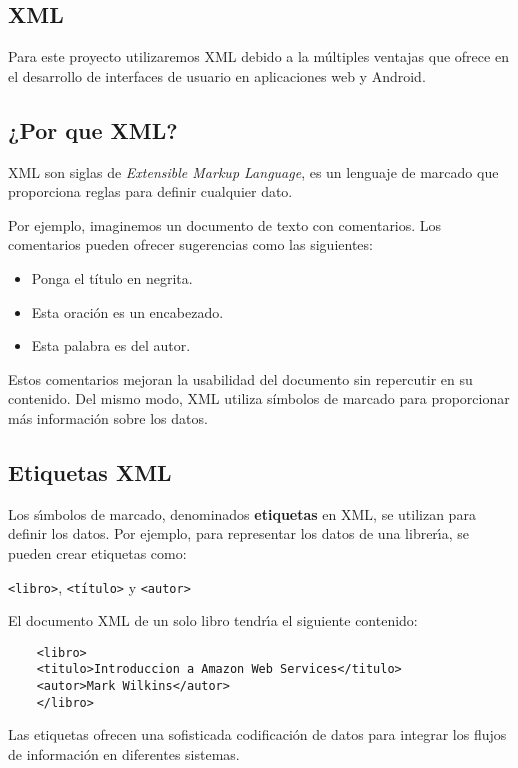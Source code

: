 

\subsection{XML}
Para este proyecto utilizaremos XML debido a la múltiples ventajas que ofrece en el desarrollo de interfaces de usuario en aplicaciones web y Android.  

\subsection*{¿Por que XML?}

XML son siglas de \textit{Extensible Markup Language}, es un lenguaje de marcado que proporciona reglas para definir cualquier dato.

Por ejemplo, imaginemos un documento de texto con comentarios. Los comentarios pueden ofrecer sugerencias como las siguientes:
\begin{itemize}
	\item Ponga el título en negrita.
	\item Esta oración es un encabezado.
	\item Esta palabra es del autor.
\end{itemize}

Estos comentarios mejoran la usabilidad del documento sin repercutir en su contenido. Del mismo modo, XML utiliza símbolos de marcado para proporcionar más información sobre los datos.

\subsection*{Etiquetas XML}

Los s\'{\i}mbolos de marcado, denominados \textbf{etiquetas} en XML, se utilizan para definir los datos. Por ejemplo, para representar los datos de una librer\'{\i}a, se pueden crear etiquetas como:

\texttt{\textless libro\textgreater}, \texttt{\textless t\'{\i}tulo\textgreater} y \texttt{\textless autor\textgreater}

El documento XML de un solo libro tendr\'{\i}a el siguiente contenido:

\begin{lstlisting}
	<libro>
	<titulo>Introduccion a Amazon Web Services</titulo>
	<autor>Mark Wilkins</autor>
	</libro>
\end{lstlisting}


Las etiquetas ofrecen una sofisticada codificaci\'{o}n de datos para integrar los flujos de informaci\'{o}n en diferentes sistemas.

